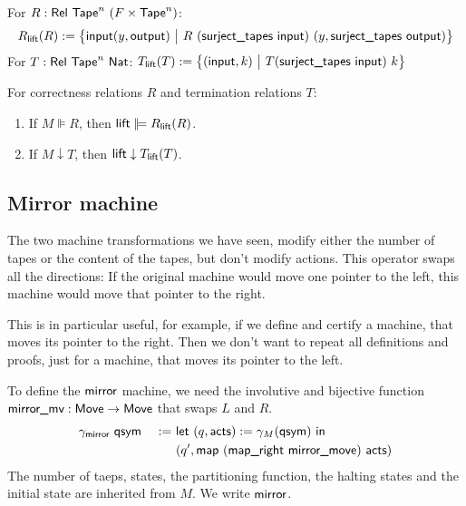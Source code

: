 \documentclass{psartcl}
\begin{document}
\begin{definition}
  \label{def:sigma,tau-rellift}
  For $R : \mathsf{Rel}~\textsf{Tape}^{n}~(F \times \textsf{Tape}^{n})$:
  $$R_{\textsf{lift}}(R) := \bigl\{ \textsf{input} (y, \textsf{output})~\big|~R~(\textsf{surject\_tapes}~\textsf{input})~(y, \textsf{surject\_tapes~\textsf{output}}) \bigr \}$$
  For $T : \mathsf{Rel}~\textsf{Tape}^{n}~\textsf{Nat}$:
  $T_{\textsf{lift}}(T) := \bigl\{ (\textsf{input}, k)~\big|~T (\textsf{surject\_tapes}~\textsf{input})~k \bigr \}$
\end{definition}
\begin{lemma}
  \label{lem:sigma-tau}
  For correctness relations $R$ and termination relations $T$:
  \begin{enumerate}
    \item
      If $M \VDash R$, then $\MS{lift} \VDash R_{\MS{lift}}(R)$.
    \item
      If $M \downarrow T$, then $\textsf{lift} \downarrow T_{\textsf{lift}}(T)$.
  \end{enumerate}
\end{lemma}


\subsection{Mirror machine}
\label{sub:mirror}

The two machine transformations we have seen, modify either the number of tapes or the content of the tapes, but don't modify actions.
This operator swaps all the directions:  If the original machine would move one pointer to the left, this machine would move that pointer to the right.

This is in particular useful, for example, if we define and certify a machine, that moves its pointer to the right.  Then we don't want to repeat all
definitions and proofs, just for a machine, that moves its pointer to the left.


To define the $\textsf{mirror}$ machine, we need the involutive and bijective function $\textsf{mirror\_mv} : \textsf{Move} \rightarrow \textsf{Move}$ that swaps $L$ and $R$.
\begin{alignat*}{3}
  &\gamma_{\textsf{mirror}}~\textsf{\textsf{qsym}} &~:=~& \textsf{let}~(q, \textsf{acts}) := \gamma_M (\textsf{qsym})~\textsf{in}~\\
  &                                  &~  ~& (q', \textsf{map}~(\textsf{\textsf{map\_right}~\textsf{mirror\_move}})~\textsf{acts})
\end{alignat*}
The number of taeps, states, the partitioning function, the halting states and the initial state are inherited from $M$.  We write $\textsf{mirror}$.
\end{document}
